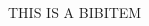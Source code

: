 \documentclass[12pt, lettersize]{article}
\begin{document}
\begin{thebibliography}{99} %

THIS IS A BIBITEM

\end{thebibliography}

\newpage
\appendix


\end{document}
